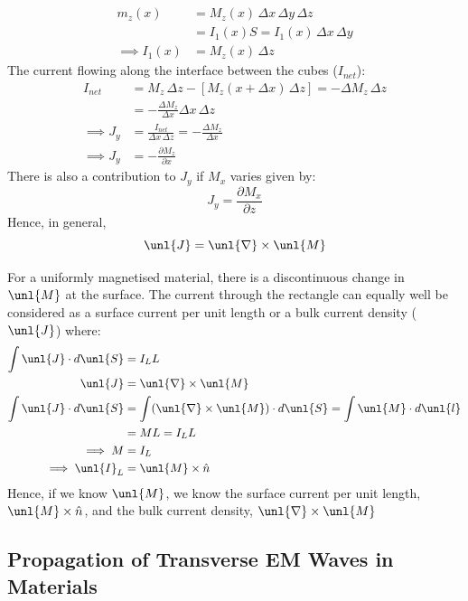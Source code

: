 \documentclass[a4paper, 11pt, normalem]{report}
\newcommand\p{\partial}
\newcommand\del{\unl{\nabla}}
\newcommand\hn{\hat{n}}
\newcommand\J{\unl{J}}
\newcommand\M{\unl{M}}
\begin{document}
\chapter{}
\begin{align*}
    m_z(x) &= M_z(x)\,\Delta x\,\Delta y\,\Delta z \\
    &= I_1(x)S = I_1(x)\,\Delta x\,\Delta y \\
    \implies I_1(x) &= M_z(x)\,\Delta z
\end{align*}
The current flowing along the interface between the cubes ($I_{net}$):
\begin{align*}
    I_{net} &= M_z\,\Delta z - [M_z(x + \Delta x)\,\Delta z] = -\Delta M_z\,\Delta z \\
    &= -\frac{\Delta M_z}{\Delta x} \Delta x\, \Delta z \\
    \implies J_y &= \frac{I_{net}}{\Delta x\,\Delta z} = - \frac{\Delta M_z}{\Delta x} \\
    \implies J_y &= -\frac{\p M_z}{\p x}
\end{align*}
There is also a contribution to $J_y$ if $M_x$ varies given by:
\begin{equation*}
    J_y = \frac{\p M_x}{\p z}
\end{equation*}
Hence, in general,
\begin{equation*}
    \J = \del \times \unl{M}
\end{equation*}

For a uniformly magnetised material, there is a discontinuous change in $\unl{M}$ at the surface.
The current through the rectangle can equally well be considered as a surface current per unit length or a bulk current density ($\J$) where:
\begin{align*}
    \int \J\cdot d\unl{S} &= I_LL \\
    \J &= \del \times \unl{M} \\
    \int \J\cdot d\unl{S} &= \int (\del\times\unl{M})\cdot d\unl{S} = \int \unl{M}\cdot d\unl{l} \\
    &= ML = I_LL \\
    \implies M &= I_L \\
    \implies \unl{I}_L &= \unl{M}\times\hn
\end{align*}
Hence, if we know $\unl{M}$, we know the surface current per unit length, $\M \times \hn$, and the bulk current density, $\del\times\M$

\section{Propagation of Transverse EM Waves in Materials}
\end{document}
